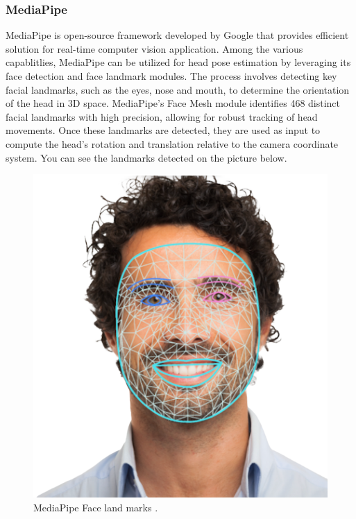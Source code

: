 \documentclass{CSSRforAfrica}
\begin{document}
\subsubsection*{MediaPipe}
MediaPipe is open-source framework developed by Google that provides efficient solution for real-time computer vision application. Among the various capablitlies, MediaPipe can be utilized for head pose estimation by leveraging its face detection and face landmark modules. The process involves detecting key facial landmarks, such as the eyes, nose and mouth, to determine the orientation of the head in 3D space. MediaPipe's Face Mesh module identifies 468 distinct facial landmarks with high precision, allowing for robust tracking of head movements. Once these landmarks are detected, they are used as input to compute the head's rotation and translation relative to the camera coordinate system. You can see the landmarks detected on the picture below. 

\newpage

\begin{figure}[!hbpt]
	\centering
	\includegraphics[scale=0.3]{images/MediaPipe_FaceLand_Marks.png}
	\caption{MediaPipe Face land marks \cite{mediapipe_face_landmarker}.}
	\label{fig: MediaPipe Face land marks}
\end{figure}
\end{document}
